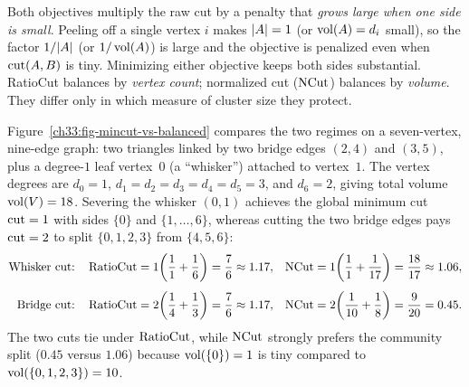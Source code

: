 \begin{focusbox}
Both objectives multiply the raw cut by a penalty that \emph{grows large when one side is small}. Peeling off
a single vertex $i$ makes $\lvert A\rvert=1$ (or $\operatorname{vol}(A)=d_i$ small), so the factor $1/\lvert A\rvert$ (or $1/\operatorname{vol}(A)$) is large and
the objective is penalized even when $\operatorname{cut}(A,B)$ is tiny. Minimizing either objective keeps both sides substantial. RatioCut
balances by \emph{vertex count}; normalized cut ($\operatorname{NCut}$) balances by \emph{volume}. They differ only in which measure of
cluster size they protect.
\end{focusbox}

Figure~\ref{ch33:fig-mincut-vs-balanced} compares the two regimes on a seven-vertex, nine-edge graph: two triangles linked by two bridge edges $(2,4)$ and $(3,5)$, plus a degree-$1$ leaf vertex~$0$ (a ``whisker'') attached to vertex~$1$. The vertex degrees are $d_0 = 1$, $d_1 = d_2 = d_3 = d_4 = d_5 = 3$, and $d_6 = 2$, giving total volume $\operatorname{vol}(V) = 18$. Severing the whisker $(0,1)$ achieves the global minimum cut $\operatorname{cut} = 1$ with sides $\{0\}$ and $\{1,\dots,6\}$, whereas cutting the two bridge edges pays $\operatorname{cut} = 2$ to split $\{0,1,2,3\}$ from $\{4,5,6\}$:
\begin{align*}
  \text{Whisker cut:} &\quad
    \operatorname{RatioCut} = 1\!\left(\frac{1}{1}+\frac{1}{6}\right) = \frac{7}{6} \approx 1.17,
    &
    \operatorname{NCut} &= 1\!\left(\frac{1}{1}+\frac{1}{17}\right) = \frac{18}{17} \approx 1.06,\\[4pt]
  \text{Bridge cut:} &\quad
    \operatorname{RatioCut} = 2\!\left(\frac{1}{4}+\frac{1}{3}\right) = \frac{7}{6} \approx 1.17,
    &
    \operatorname{NCut} &= 2\!\left(\frac{1}{10}+\frac{1}{8}\right) = \frac{9}{20} = 0.45.
\end{align*}
The two cuts tie under $\operatorname{RatioCut}$, while $\operatorname{NCut}$ strongly prefers the community split ($0.45$ versus $1.06$) because $\operatorname{vol}(\{0\})=1$ is tiny compared to $\operatorname{vol}(\{0,1,2,3\})=10$.

